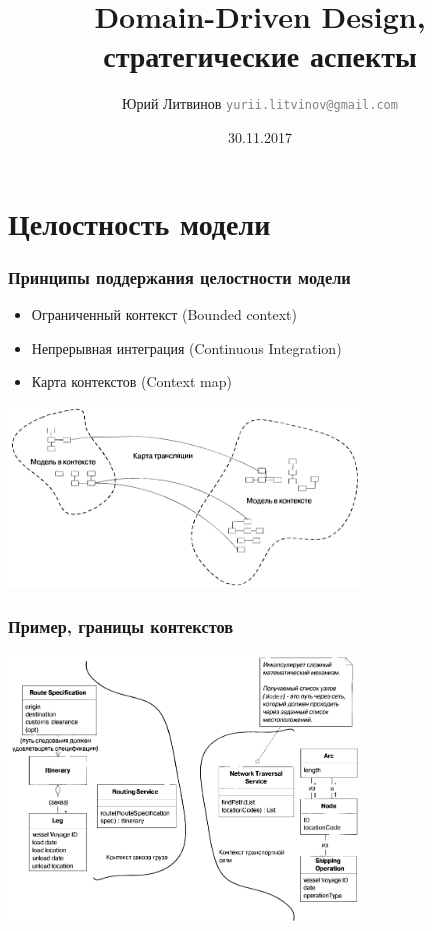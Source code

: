 \documentclass[xetex,mathserif,serif]{beamer}
\title{Domain-Driven Design, стратегические аспекты}
\author[Юрий Литвинов]{Юрий Литвинов \newline \textcolor{gray}{\small\texttt{yurii.litvinov@gmail.com}}}
\date{30.11.2017}
\begin{document}
	
	\frame{\titlepage}

	\section{Целостность модели}

	\begin{frame}
		\frametitle{Принципы поддержания целостности модели}
		\begin{itemize}
			\item Ограниченный контекст (Bounded context)
			\item Непрерывная интеграция (Continuous Integration)
			\item Карта контекстов (Context map)
		\end{itemize}
		\begin{center}
			\includegraphics[width=0.7\textwidth]{contextMap.png}
		\end{center}
	\end{frame}

	\begin{frame}
		\frametitle{Пример, границы контекстов}
		\begin{center}
			\includegraphics[width=0.7\textwidth]{contextBoundariesExample.png}
		\end{center}
	\end{frame}
\end{document}
